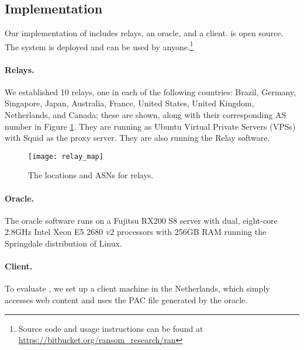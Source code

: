 \subsection{Implementation}

Our implementation of \system{} includes relays, an oracle, and 
a client. \system{} is open source.  The system is deployed and 
can be used by anyone.\footnote{Source code and usage instructions can be found at \url{https://bitbucket.org/ransom_research/ran}}

\paragraph{Relays.}  We established 10 relays, one in each of the following countries: Brazil, 
Germany, Singapore, Japan, Australia, France, United States, United Kingdom, Netherlands, and Canada; these 
are shown, along with their corresponding AS number in Figure \ref{fig:relay_locations}.  
They are running as Ubuntu Virtual Private Servers (VPSs) with 
Squid as the proxy server.  They are also running the \system{} Relay software.

\begin{figure}[t!]
\centering
\texttt{[image: relay\_map]}
\caption{The locations and ASNs for \system{} relays.}
\label{fig:relay_locations}
\end{figure}

\paragraph{Oracle.}  The oracle software runs on a Fujitsu RX200 S8 server with dual, 
eight-core 2.8GHz Intel Xeon E5 2680 v2 processors with 256GB RAM running the 
Springdale distribution of Linux. 

\paragraph{Client.} To evaluate \system{}, we set up a client 
machine in the Netherlands, which simply accesses web content and uses the PAC 
file generated by the oracle. 
